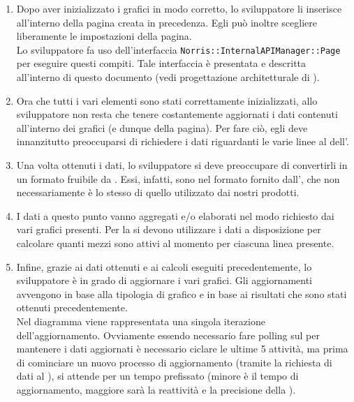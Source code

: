 \begin{enumerate}
            \item Dopo aver inizializzato i grafici in modo corretto, lo sviluppatore li inserisce all'interno della pagina creata in precedenza. Egli può inoltre scegliere liberamente le impostazioni della pagina.\\
            Lo sviluppatore fa uso dell'interfaccia \texttt{Norris::InternalAPIManager::Page} per eseguire questi compiti. Tale interfaccia è presentata e descritta all'interno di questo documento (vedi progettazione architetturale di ).
            \item Ora che tutti i vari elementi sono stati correttamente inizializzati, allo sviluppatore non resta che tenere costantemente aggiornati i dati contenuti all'interno dei grafici (e dunque della pagina). Per fare ciò, egli deve innanzitutto preoccuparsi di richiedere i dati riguardanti le varie linee al  dell'.
            \item Una volta ottenuti i dati, lo sviluppatore si deve preoccupare di convertirli in un formato fruibile da . Essi, infatti, sono nel formato fornito dall', che non necessariamente è lo stesso di quello utilizzato dai nostri prodotti.
            \item I dati a questo punto vanno aggregati e/o elaborati nel modo richiesto dai vari grafici presenti.
            Per la  si devono utilizzare i dati a disposizione per calcolare quanti mezzi sono attivi al momento per ciascuna linea presente.
           
            \item Infine, grazie ai dati ottenuti e ai calcoli eseguiti precedentemente, lo sviluppatore è in grado di aggiornare i vari grafici. Gli aggiornamenti avvengono in base alla tipologia di grafico e in base ai risultati che sono stati ottenuti precedentemente.\\
            Nel diagramma viene rappresentata una singola iterazione dell'aggiornamento. Ovviamente essendo necessario fare polling sul  per mantenere i dati aggiornati è necessario ciclare le ultime 5 attività, ma prima di cominciare un nuovo processo di aggiornamento (tramite la richiesta di dati al  ), si attende per un tempo prefissato (minore è il tempo di aggiornamento, maggiore sarà la reattività e la precisione della ).
        \end{enumerate}
